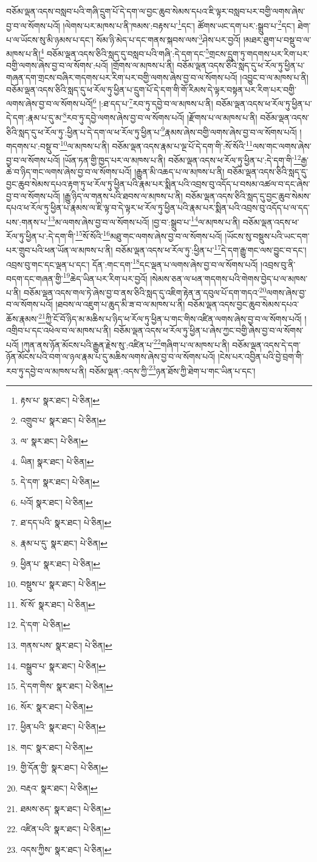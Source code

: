 བཅོམ་ལྡན་འདས་བསླབ་པའི་གཞི་དྲུག་པོ་དེ་དག་ལ་བྱང་ཆུབ་སེམས་དཔའ་ཇི་ལྟར་བསླབ་པར་བགྱི་ལགས་ཞེས་བྱ་བ་ལ་སོགས་པའོ། །ལེགས་པར་མཁས་པ་ནི་ཁམས་:བརྟས་པ་\footnote{རྟས་པ་  སྣར་ཐང་།  པེ་ཅིན། }དང་། ཚོགས་ཡང་དག་པར་:སྒྲུབ་པ་\footnote{འགྲུབ་པ་  སྣར་ཐང་།  པེ་ཅིན། }དང་། ཐེག་པ་ལ་ཡོངས་སུ་མི་ཉམས་པ་དང་། སོམ་ཉི་མེད་པ་དང་གནས་སྐབས་ལས་\footnote{ལ་  སྣར་ཐང་།  པེ་ཅིན། }ཤེས་པར་བྱའོ། །མཐར་ཐུག་པ་བསྡུ་བ་ལ་མཁས་པ་ནི།\footnote{ཡིན།  སྣར་ཐང་།  པེ་ཅིན། } བཅོམ་ལྡན་འདས་ཅིའི་སླད་དུ་བསླབ་པའི་གཞི་:དེ་དག་དང་\footnote{དེ་དག་  སྣར་ཐང་།  པེ་ཅིན། }གྲངས་དྲུག་ཏུ་གདགས་པར་རིག་པར་བགྱི་ལགས་ཞེས་བྱ་བ་ལ་སོགས་:པའོ། །གྲོགས་ལ་མཁས་པ་ནི། བཅོམ་ལྡན་འདས་ཅིའི་སླད་དུ་ཕ་རོལ་ཏུ་ཕྱིན་པ་གཞན་དག་གྲངས་བཞིར་གདགས་པར་རིག་པར་བགྱི་ལགས་ཞེས་བྱ་བ་ལ་སོགས་པའོ། །འབྱུང་བ་ལ་མཁས་པ་ནི། བཅོམ་ལྡན་འདས་ཅིའི་སླད་དུ་ཕ་རོལ་ཏུ་ཕྱིན་པ་དྲུག་པོ་དེ་དག་གི་གོ་རིམས་དེ་ལྟར་བསྟན་པར་རིག་པར་བགྱི་ལགས་ཞེས་བྱ་བ་ལ་སོགས་པའོ།\footnote{པའོ།  སྣར་ཐང་།  པེ་ཅིན། } །:ཐ་དད་པ་\footnote{ཐ་དད་པའི་  སྣར་ཐང་།  པེ་ཅིན། }རབ་ཏུ་དབྱེ་བ་ལ་མཁས་པ་ནི། བཅོམ་ལྡན་འདས་ཕ་རོལ་ཏུ་ཕྱིན་པ་དེ་དག་:རྣམ་པ་དུ་མ་\footnote{རྣམ་པ་དུ་  སྣར་ཐང་།  པེ་ཅིན། }རབ་ཏུ་དབྱེ་ལགས་ཞེས་བྱ་བ་ལ་སོགས་པའོ། །རྫོགས་པ་ལ་མཁས་པ་ནི། བཅོམ་ལྡན་འདས་ཅིའི་སླད་དུ་ཕ་རོལ་ཏུ་:ཕྱིན་པ་དེ་དག་ལ་ཕ་རོལ་ཏུ་ཕྱིན་པ་\footnote{ཕྱིན་པ་  སྣར་ཐང་།  པེ་ཅིན། }རྣམས་ཞེས་བགྱི་ལགས་ཞེས་བྱ་བ་ལ་སོགས་པའོ། །གདགས་པ་:བསྡུ་བ་\footnote{བསྡུས་པ་  སྣར་ཐང་།  པེ་ཅིན། }ལ་མཁས་པ་ནི། བཅོམ་ལྡན་འདས་རྣམ་པ་ལྔ་པོ་དེ་དག་གི་:སོ་སོའི་\footnote{སོ་སོ་  སྣར་ཐང་།  པེ་ཅིན། }ལས་གང་ལགས་ཞེས་བྱ་བ་ལ་སོགས་པའོ། །ཡོན་ཏན་གྱི་ཁྱད་པར་ལ་མཁས་པ་ནི། བཅོམ་ལྡན་འདས་ཕ་རོལ་ཏུ་ཕྱིན་པ་:དེ་དག་གི་\footnote{དེ་དག་  པེ་ཅིན། }རྒྱ་ཆེ་བ་ཉིད་གང་ལགས་ཞེས་བྱ་བ་ལ་སོགས་པའོ། །རྒྱུན་མི་འཆད་པ་ལ་མཁས་པ་ནི། བཅོམ་ལྡན་འདས་ཅིའི་སླད་དུ་བྱང་ཆུབ་སེམས་དཔའ་རྟག་ཏུ་ཕ་རོལ་ཏུ་ཕྱིན་པའི་རྣམ་པར་སྨིན་པའི་འབྲས་བུ་འདོད་པ་བསམ་འཚལ་བ་དང་ཞེས་བྱ་བ་ལ་སོགས་པའོ། །རྒྱུ་ཉིད་ལ་གནས་པའི་ཐབས་ལ་མཁས་པ་ནི། བཅོམ་ལྡན་འདས་ཅིའི་སླད་དུ་བྱང་ཆུབ་སེམས་དཔའ་ཕ་རོལ་ཏུ་ཕྱིན་པ་རྣམས་ལ་ཇི་ལྟ་བ་དེ་ལྟར་ཕ་རོལ་ཏུ་ཕྱིན་པའི་རྣམ་པར་སྨིན་པའི་འབྲས་བུ་འདོད་པ་ལ་དད་པས་:གནས་པ་\footnote{གནས་པས་  སྣར་ཐང་།  པེ་ཅིན། }མ་ལགས་ཞེས་བྱ་བ་ལ་སོགས་པའོ། །བྱ་བ་:སྒྲུབ་པ་\footnote{བསྒྲུབ་པ་  སྣར་ཐང་།  པེ་ཅིན། }ལ་མཁས་པ་ནི། བཅོམ་ལྡན་འདས་ཕ་རོལ་ཏུ་ཕྱིན་པ་:དེ་དག་གི་\footnote{དེ་དག་གིས་  སྣར་ཐང་།  པེ་ཅིན། }སོ་སོའི་\footnote{སོར་  སྣར་ཐང་།  པེ་ཅིན། }མཐུ་གང་ལགས་ཞེས་བྱ་བ་ལ་སོགས་པའོ། །ཡོངས་སུ་བསྡུས་པའི་ཡང་དག་པར་གྲུབ་པའི་ཕན་ཡོན་ལ་མཁས་པ་ནི། བཅོམ་ལྡན་འདས་ཕ་རོལ་ཏུ་:ཕྱིན་པ་\footnote{ཕྱིན་པའི་  སྣར་ཐང་།  པེ་ཅིན། }དེ་དག་རྒྱུ་གང་ལས་བྱུང་བ་དང་། འབྲས་བུ་གང་དང་ལྡན་པ་དང་། དོན་:གང་དག་\footnote{གང་  སྣར་ཐང་།  པེ་ཅིན། }དང་ལྡན་པ་ལགས་ཞེས་བྱ་བ་ལ་སོགས་པའོ། །འབྲས་བུ་ནི་བདག་དང་གཞན་གྱི་\footnote{གྱི་དོན་གྱི་  སྣར་ཐང་།  པེ་ཅིན། }ཆེད་ཡིན་པར་རིག་པར་བྱའོ། །སེམས་ཅན་ལ་ཕན་གདགས་པའི་གེགས་བྱེད་པ་ལ་མཁས་པ་ནི། བཅོམ་ལྡན་འདས་གལ་ཏེ་ཞེས་བྱ་བ་ནས་ཅིའི་སླད་དུ་འཇིག་རྟེན་ན་དབུལ་པོ་དག་གདའ་\footnote{བརྡའ་  སྣར་ཐང་།  པེ་ཅིན། }ལགས་ཞེས་བྱ་བ་ལ་སོགས་པའོ། །ཐབས་ལ་འཇུག་པ་ཆུད་མི་ཟ་བ་ལ་མཁས་པ་ནི། བཅོམ་ལྡན་འདས་བྱང་ཆུབ་སེམས་དཔའ་ཆོས་རྣམས་\footnote{ཐམས་ཅད་  སྣར་ཐང་།  པེ་ཅིན། }ཀྱི་ངོ་བོ་ཉིད་མ་མཆིས་པ་ཉིད་ཕ་རོལ་ཏུ་ཕྱིན་པ་གང་གིས་འཛིན་ལགས་ཞེས་བྱ་བ་ལ་སོགས་པའོ། །འགྲིབ་པ་དང་འཕེལ་བ་ལ་མཁས་པ་ནི། བཅོམ་ལྡན་འདས་ཕ་རོལ་ཏུ་ཕྱིན་པ་ཞེས་ཀྱང་བགྱི་ཞེས་བྱ་བ་ལ་སོགས་པའོ། །ཀུན་ནས་ཉོན་མོངས་པའི་རྒྱུན་རྗེས་སུ་:འཛིན་པ་\footnote{འཛིན་པའི་  སྣར་ཐང་།  པེ་ཅིན། }གཞིག་པ་ལ་མཁས་པ་ནི། བཅོམ་ལྡན་འདས་དེ་དག་ཉོན་མོངས་པའི་བག་ལ་ཉལ་རྣམ་པ་དུ་མཆིས་ལགས་ཞེས་བྱ་བ་ལ་སོགས་པའོ། །ངེས་པར་འབྱིན་པའི་བྱེ་བྲག་གི་རབ་ཏུ་དབྱེ་བ་ལ་མཁས་པ་ནི། བཅོམ་ལྡན་:འདས་ཀྱི་\footnote{འདས་ཀྱིས་  སྣར་ཐང་།  པེ་ཅིན། }ཉན་ཐོས་ཀྱི་ཐེག་པ་གང་ཡིན་པ་དང་། 